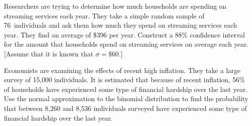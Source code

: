 \documentclass[11pt,letterpaper]{article}
\begin{document}

 Researchers are trying to determine how much households are spending on streaming services each year. They take a simple random sample of 76~individuals and ask them how much they spend on streaming services each year. They find an average of \$396 per year. Construct a 88\% confidence interval for the amount that households spend on streaming services on average each year. [Assume that it is known that $\sigma= \$60$.]



\newpage



 Economists are examining the effects of recent high inflation. They take a large survey of 15,000 individuals. It is estimated that because of recent inflation, 56\% of households have experienced some type of financial hardship over the last year. Use the normal approximation to the binomial distribution to find the probability that between 8,260 and 8,536 individuals surveyed have experienced some type of financial hardship over the last year. 
\end{document}
